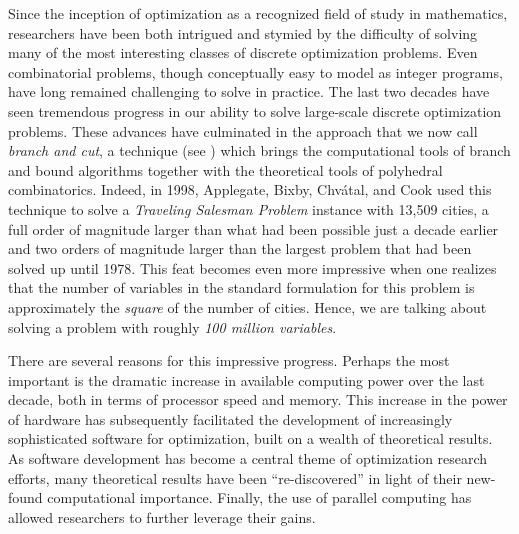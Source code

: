 Since the inception of optimization as a recognized field of study in
mathematics, researchers have been both intrigued and stymied by the
difficulty of solving many of the most interesting classes of discrete
optimization problems. Even combinatorial problems, though conceptually easy
to model as integer programs, have long remained challenging to solve in
practice. The last two decades have seen tremendous progress in our ability to
solve large-scale discrete optimization problems. These advances have
culminated in the approach that we now call {\it branch and cut}, a technique
(see \cite{Grotschel84cut,padb:branc,hoff:LP}) which brings the computational
tools of branch and bound algorithms together with the theoretical tools of
polyhedral combinatorics. Indeed, in 1998, Applegate, Bixby, Chv\'atal, and
Cook used this technique to solve a {\em Traveling Salesman Problem} instance
with 13,509 cities, a full order of magnitude larger than what had been
possible just a decade earlier \cite{concorde} and two orders of magnitude
larger than the largest problem that had been solved up until 1978. This feat
becomes even more impressive when one realizes that the number of variables in
the standard formulation for this problem is approximately the {\em square} of
the number of cities. Hence, we are talking about solving a problem with
roughly {\em 100 million variables}.

There are several reasons for this impressive progress. Perhaps the most
important is the dramatic increase in available computing power over the last
decade, both in terms of processor speed and memory. This increase in the
power of hardware has subsequently facilitated the development of increasingly
sophisticated software for optimization, built on a wealth of theoretical
results. As software development has become a central theme of optimization
research efforts, many theoretical results have been ``re-discovered'' in
light of their new-found computational importance. Finally, the use of
parallel computing has allowed researchers to further leverage their gains.

